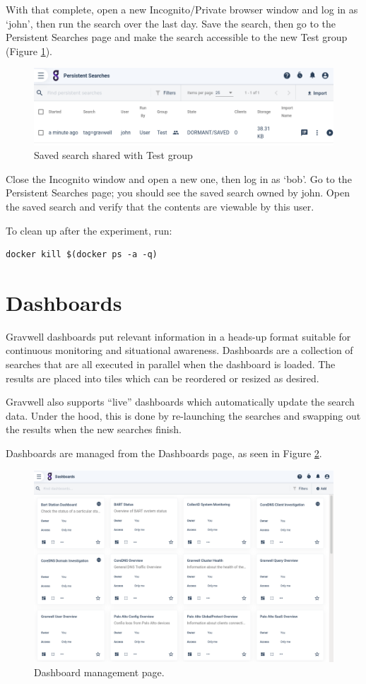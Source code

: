With that complete, open a new Incognito/Private browser window and log
in as `john', then run the search  over the last day. Save
the search, then go to the Persistent Searches page and make the search
accessible to the new Test group (Figure \ref{fig:lab-shared-search}).

\begin{figure}
	\includegraphics[width=0.7\linewidth]{images/lab-shared-search.png}
	\caption{Saved search shared with Test group}
	\label{fig:lab-shared-search}
\end{figure}

Close the Incognito window and open a new one, then log in as `bob'. Go
to the Persistent Searches page; you should see the saved search owned
by john. Open the saved search and verify that the contents are viewable by this
user.

To clean up after the experiment, run:

\begin{Verbatim}[breaklines=true]
docker kill $(docker ps -a -q)
\end{Verbatim}



\section{Dashboards}
\label{sec:dashboards}
Gravwell dashboards put relevant information in a
heads-up format suitable for continuous monitoring and situational
awareness. Dashboards are a collection of searches that are all executed in
parallel when the dashboard is loaded. The results are placed into tiles
which can be reordered or resized as desired.

Gravwell also supports ``live'' dashboards which automatically update
the search data. Under the hood, this is done by re-launching the
searches and swapping out the results when the new searches finish.

Dashboards are managed from the Dashboards page, as seen in Figure \ref{fig:dashboards}. 

\begin{figure}
	\includegraphics[width=0.8\linewidth]{images/dashboards.png}
	\caption{Dashboard management page.}
	\label{fig:dashboards}
\end{figure}

